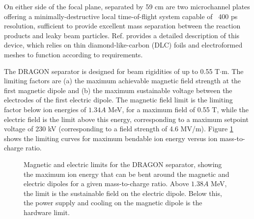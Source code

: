 On either side of the focal plane, separated by 59 cm are two microchannel plates offering a minimally-destructive local time-of-flight system capable of ~400 ps resolution, sufficient to provide excellent mass separation between the reaction products and leaky beam particles. Ref. \cite{vock09} provides a detailed description of this device, which relies on thin diamond-like-carbon (DLC) foils and electroformed meshes to function according to requirements. 

The DRAGON separator is designed for beam rigidities of up to 0.55 T$\cdot$m. The limiting factors are (a) the maximum achievable magnetic field strength at the first magnetic dipole and (b) the maximum sustainable voltage between the electrodes of the first electric dipole. The magnetic field limit is the limiting factor below ion energies of $1.34A$ MeV, for a maximum field of 0.55 T, while the electric field is the limit above this energy, corresponding to a maximum setpoint voltage of 230 kV (corresponding to a field strength of 4.6 MV/m). Figure \ref{fig:rigidity} shows the limiting curves for maximum bendable ion energy versus ion mass-to-charge ratio.   

\begin{figure}
\caption{Magnetic and electric limits for the DRAGON separator, showing the maximum ion energy that can be bent around the magnetic and electric dipoles for a given mass-to-charge ratio. Above $1.38A$ MeV, the limit is the sustainable field on the electric dipole. Below this, the power supply and cooling on the magnetic dipole is the hardware limit.}
\label{fig:rigidity}
\end{figure}

